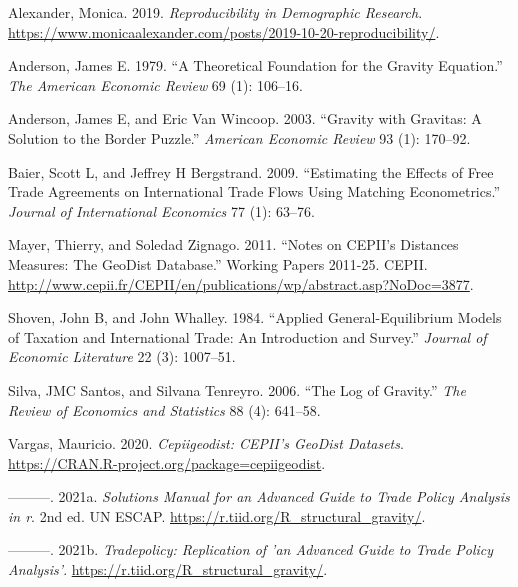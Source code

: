 \documentclass[12pt,reqno,oneside,pdftex]{formato-puc/puctesis} %
\newenvironment{CSLReferences}
  {}
  {\par}
\begin{document}
\hypertarget{refs}{}
\begin{CSLReferences}{1}{0}
\leavevmode\hypertarget{ref-malexander19}{}%
Alexander, Monica. 2019. \emph{Reproducibility in Demographic Research}.
\url{https://www.monicaalexander.com/posts/2019-10-20-reproducibility/}.

\leavevmode\hypertarget{ref-anderson1979theoretical}{}%
Anderson, James E. 1979. {``A Theoretical Foundation for the Gravity
Equation.''} \emph{The American Economic Review} 69 (1): 106--16.

\leavevmode\hypertarget{ref-anderson2003gravity}{}%
Anderson, James E, and Eric Van Wincoop. 2003. {``Gravity with Gravitas:
A Solution to the Border Puzzle.''} \emph{American Economic Review} 93
(1): 170--92.

\leavevmode\hypertarget{ref-baier2009estimating}{}%
Baier, Scott L, and Jeffrey H Bergstrand. 2009. {``Estimating the
Effects of Free Trade Agreements on International Trade Flows Using
Matching Econometrics.''} \emph{Journal of International Economics} 77
(1): 63--76.

\leavevmode\hypertarget{ref-CEPII201125}{}%
Mayer, Thierry, and Soledad Zignago. 2011. {``Notes on CEPII's Distances
Measures: The GeoDist Database.''} Working Papers 2011-25. CEPII.
\url{http://www.cepii.fr/CEPII/en/publications/wp/abstract.asp?NoDoc=3877}.

\leavevmode\hypertarget{ref-shoven1984applied}{}%
Shoven, John B, and John Whalley. 1984. {``Applied General-Equilibrium
Models of Taxation and International Trade: An Introduction and
Survey.''} \emph{Journal of Economic Literature} 22 (3): 1007--51.

\leavevmode\hypertarget{ref-silva2006log}{}%
Silva, JMC Santos, and Silvana Tenreyro. 2006. {``The Log of Gravity.''}
\emph{The Review of Economics and Statistics} 88 (4): 641--58.

\leavevmode\hypertarget{ref-cepiigeodist}{}%
Vargas, Mauricio. 2020. \emph{Cepiigeodist: CEPII's GeoDist Datasets}.
\url{https://CRAN.R-project.org/package=cepiigeodist}.

\leavevmode\hypertarget{ref-solutionsagtpa}{}%
---------. 2021a. \emph{Solutions Manual for an Advanced Guide to Trade
Policy Analysis in r}. 2nd ed. UN ESCAP.
\url{https://r.tiid.org/R_structural_gravity/}.

\leavevmode\hypertarget{ref-tradepolicy}{}%
---------. 2021b. \emph{Tradepolicy: Replication of 'an Advanced Guide
to Trade Policy Analysis'}.
\url{https://r.tiid.org/R_structural_gravity/}.


\end{CSLReferences}
\end{document}
